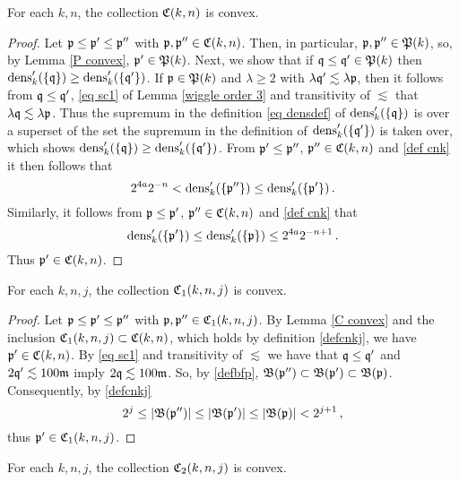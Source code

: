 {\begin{lemma}
    \label{C convex}
    For each $k,n$, the collection $\mathfrak C(k,n)$ is convex.
\end{lemma}

\begin{proof}
    Let $\mathfrak p \le \mathfrak p' \le \mathfrak p''$ with $\mathfrak p, \mathfrak p'' \in \mathfrak C(k,n)$. Then, in particular, $\mathfrak p, \mathfrak p'' \in \mathfrak P(k)$, so, by Lemma \ref{P convex}, $\mathfrak p' \in \mathfrak P(k)$. Next, we show that if $\mathfrak q \le \mathfrak q' \in \mathfrak P(k)$ then $\operatorname{\operatorname{dens}}'_k(\{\mathfrak q\}) \ge \operatorname{\operatorname{dens}}_k'(\{\mathfrak q'\})$. If $\mathfrak p \in \mathfrak P(k)$ and $\lambda \ge 2$ with $\lambda \mathfrak q' \lesssim \lambda \mathfrak p$, then it follows from $\mathfrak q \le \mathfrak q'$, \eqref{eq sc1} of Lemma \ref{wiggle order 3} and transitivity of $\lesssim$ that $\lambda \mathfrak q \lesssim \lambda \mathfrak p$. Thus the supremum in the definition \eqref{eq densdef} of $\operatorname{\operatorname{dens}}_k'(\{\mathfrak q\})$ is over a superset of the set the  supremum in the definition of $\operatorname{\operatorname{dens}}_k'(\{\mathfrak q'\})$ is taken over, which shows $\operatorname{\operatorname{dens}}'_k(\{\mathfrak q\}) \ge \operatorname{\operatorname{dens}}_k'(\{\mathfrak q'\})$. From $\mathfrak p' \le \mathfrak p''$, $\mathfrak p'' \in \mathfrak C(k,n)$ and \eqref{def cnk} it then follows that
    $$
        2^{4a}2^{-n} < \operatorname{\operatorname{dens}}_k'(\{\mathfrak p''\}) \le \operatorname{\operatorname{dens}}_k'(\{\mathfrak p'\})\,.
    $$
    Similarly, it follows from $\mathfrak p \le \mathfrak p'$, $\mathfrak p'' \in \mathfrak C(k,n)$ and \eqref{def cnk} that
    $$
        \operatorname{\operatorname{dens}}_k'(\{\mathfrak p'\}) \le \operatorname{\operatorname{dens}}_k'(\{\mathfrak p\}) \le 2^{4a}2^{-n+1}\,.
    $$
    Thus $\mathfrak p' \in \mathfrak C(k,n)$.
\end{proof}

\begin{lemma}
    \label{C1 convex}
    For each $k,n,j$, the collection $\mathfrak C_1(k,n,j)$ is convex.
\end{lemma}

\begin{proof}
    Let $\mathfrak p\le\mathfrak p'\le\mathfrak p''$ with $\mathfrak p, \mathfrak p'' \in \mathfrak C_1(k,n,j)$. By Lemma \ref{C convex} and the inclusion $\mathfrak C_1(k,n,j) \subset \mathfrak C(k,n)$, which holds by definition \eqref{defcnkj}, we have $\mathfrak p' \in \mathfrak C(k,n)$. By \eqref{eq sc1} and transitivity of $\lesssim$ we have that $\mathfrak q \le \mathfrak q'$ and $2 \mathfrak q' \lesssim 100\mathfrak{m}$ imply $2\mathfrak q \lesssim 100\mathfrak{m}$. So, by \eqref{defbfp}, $\mathfrak{B}(\mathfrak p'') \subset \mathfrak{B}(\mathfrak p') \subset \mathfrak{B}(\mathfrak p)$. Consequently, by \eqref{defcnkj}
    $$
        2^j \le |\mathfrak{B}(\mathfrak p'')|\le |\mathfrak{B}(\mathfrak p')| \le |\mathfrak{B}(\mathfrak p)| < 2^{j+1}\,,
    $$
    thus $\mathfrak p' \in \mathfrak C_1(k,n,j)$.
\end{proof}

\begin{lemma}
    \label{C2 convex}
    For each $k,n,j$, the collection $\mathfrak C_2(k,n,j)$ is convex.
\end{lemma}

}
